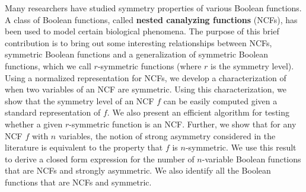 Many researchers have studied symmetry properties of 
various Boolean functions. 
A class of Boolean functions, 
called \textbf{nested canalyzing functions} (NCFs),
has been used to model certain biological phenomena.
The purpose of this brief contribution is to bring out 
some interesting relationships between NCFs, symmetric 
Boolean functions and a generalization of symmetric Boolean functions,
which we call $r$-symmetric functions (where $r$ is the symmetry level).
Using a normalized representation for NCFs, we develop a 
characterization of when two variables of an NCF are symmetric.
Using this characterization, we show 
that the symmetry level of an NCF $f$
can be easily computed given a standard representation of $f$.
We also present an efficient algorithm for testing whether 
a given $r$-symmetric function is an NCF.
Further, we show that for any NCF $f$ with $n$ variables, the notion of
strong asymmetry considered in the literature is equivalent to
the property that $f$ is $n$-symmetric. 
We use this result to derive a closed form expression for the
number of $n$-variable Boolean functions 
that are NCFs and strongly asymmetric.
We also identify all the Boolean functions that are NCFs 
and symmetric. 
